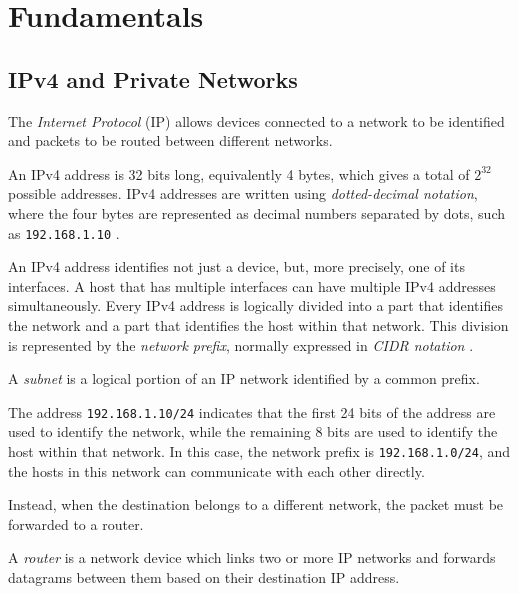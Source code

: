 \chapter{Fundamentals}
\section{IPv4 and Private Networks}
\begin{definition}
	The \textit{Internet Protocol} (IP) allows devices connected to a network to be identified and packets to be routed between different networks.
\end{definition}

An IPv4 address is 32 bits long, equivalently 4 bytes, which gives a total of \(2^{32}\) possible addresses. IPv4 addresses are written using \textit{dotted-decimal notation}, where the four bytes are represented as decimal numbers separated by dots, such as \texttt{192.168.1.10} \cite{rfc791}.

An IPv4 address identifies not just a device, but, more precisely, one of its interfaces. A host that has multiple interfaces can have multiple IPv4 addresses simultaneously. Every IPv4 address is logically divided into a part that identifies the network and a part that identifies the host within that network. This division is represented by the \textit{network prefix}, normally expressed in \textit{CIDR notation} \cite{rfc4632}.

\begin{definition}
	A \textit{subnet} is a logical portion of an IP network identified by a common prefix.
\end{definition}

\begin{example}
	The address \texttt{192.168.1.10/24} indicates that the first 24 bits of the address are used to identify the network, while the remaining 8 bits are used to identify the host within that network. In this case, the network prefix is \texttt{192.168.1.0/24}, and the hosts in this network can communicate with each other directly.
\end{example}

Instead, when the destination belongs to a different network, the packet must be forwarded to a router.

\begin{definition}
	A \textit{router} is a network device which links two or more IP networks and forwards datagrams between them based on their destination IP address.
\end{definition}

